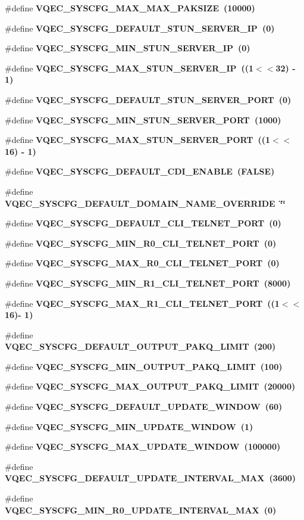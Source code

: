 \begin{CompactItemize}
\#define \bf{VQEC\_\-SYSCFG\_\-MAX\_\-MAX\_\-PAKSIZE}~(10000)
\item 
\#define \bf{VQEC\_\-SYSCFG\_\-DEFAULT\_\-STUN\_\-SERVER\_\-IP}~(0)
\item 
\#define \bf{VQEC\_\-SYSCFG\_\-MIN\_\-STUN\_\-SERVER\_\-IP}~(0)
\item 
\#define \bf{VQEC\_\-SYSCFG\_\-MAX\_\-STUN\_\-SERVER\_\-IP}~((1$<$$<$32) - 1)
\item 
\#define \bf{VQEC\_\-SYSCFG\_\-DEFAULT\_\-STUN\_\-SERVER\_\-PORT}~(0)
\item 
\#define \bf{VQEC\_\-SYSCFG\_\-MIN\_\-STUN\_\-SERVER\_\-PORT}~(1000)
\item 
\#define \bf{VQEC\_\-SYSCFG\_\-MAX\_\-STUN\_\-SERVER\_\-PORT}~((1$<$$<$16) - 1)
\item 
\#define \bf{VQEC\_\-SYSCFG\_\-DEFAULT\_\-CDI\_\-ENABLE}~(\bf{FALSE})
\item 
\#define \bf{VQEC\_\-SYSCFG\_\-DEFAULT\_\-DOMAIN\_\-NAME\_\-OVERRIDE}~\char`\"{}\char`\"{}
\item 
\#define \bf{VQEC\_\-SYSCFG\_\-DEFAULT\_\-CLI\_\-TELNET\_\-PORT}~(0)
\item 
\#define \bf{VQEC\_\-SYSCFG\_\-MIN\_\-R0\_\-CLI\_\-TELNET\_\-PORT}~(0)
\item 
\#define \bf{VQEC\_\-SYSCFG\_\-MAX\_\-R0\_\-CLI\_\-TELNET\_\-PORT}~(0)
\item 
\#define \bf{VQEC\_\-SYSCFG\_\-MIN\_\-R1\_\-CLI\_\-TELNET\_\-PORT}~(8000)
\item 
\#define \bf{VQEC\_\-SYSCFG\_\-MAX\_\-R1\_\-CLI\_\-TELNET\_\-PORT}~((1$<$$<$16)- 1)
\item 
\#define \bf{VQEC\_\-SYSCFG\_\-DEFAULT\_\-OUTPUT\_\-PAKQ\_\-LIMIT}~(200)
\item 
\#define \bf{VQEC\_\-SYSCFG\_\-MIN\_\-OUTPUT\_\-PAKQ\_\-LIMIT}~(100)
\item 
\#define \bf{VQEC\_\-SYSCFG\_\-MAX\_\-OUTPUT\_\-PAKQ\_\-LIMIT}~(20000)
\item 
\#define \bf{VQEC\_\-SYSCFG\_\-DEFAULT\_\-UPDATE\_\-WINDOW}~(60)
\item 
\#define \bf{VQEC\_\-SYSCFG\_\-MIN\_\-UPDATE\_\-WINDOW}~(1)
\item 
\#define \bf{VQEC\_\-SYSCFG\_\-MAX\_\-UPDATE\_\-WINDOW}~(100000)
\item 
\#define \bf{VQEC\_\-SYSCFG\_\-DEFAULT\_\-UPDATE\_\-INTERVAL\_\-MAX}~(3600)
\item 
\#define \bf{VQEC\_\-SYSCFG\_\-MIN\_\-R0\_\-UPDATE\_\-INTERVAL\_\-MAX}~(0)
\item 
$$
\end{CompactItemize}
